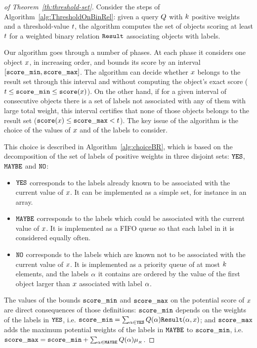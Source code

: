   \begin{PROOF}
    \begin{proof}[of Theorem~\ref{th:threshold-set}]
      Consider the steps of Algorithm~\ref{alg:ThresholdOnBinRel}:
      given a query $Q$ with $k$ positive weights and a
      threshold-value $t$, the algorithm computes the set of
      objects scoring at least $t$ for a weighted binary
      relation $\hbox{\tt Result}$ associating objects with labels.

      Our algorithm goes through a number of phases. At each phase it
      considers one object $x$, in increasing order, and bounds
      its score by an interval $[\mathtt{score\_min},\mathtt{score\_max}]$.
      The algorithm can decide whether $x$ belongs to the
      result set through this interval and without computing the
      object's exact score
      ($t\leq\mathtt{score\_min}\leq\mathtt{score}(x)$).
      On the other hand, if for a given interval of consecutive
      objects there is a set of labels not associated with any of them
      with large total weight, this interval certifies that none of
      those objects belongs to the result set
      ($\mathtt{score}(x)\leq\mathtt{score\_max}<t$).
      The key issue of the algorithm is the choice of the values of
      $x$ and of the labels to consider.

      This choice is described in Algorithm~\ref{alg:choiceBR}, which
      is based on the decomposition of the set of labels of positive
      weights in three disjoint sets: $\mathtt{YES}$, $\mathtt{MAYBE}$ and
      $\mathtt{NO}$:
      \begin{itemize}
      \item $\mathtt{YES}$ corresponds to the labels already known to be
        associated with the current value of $x$. It can be
        implemented as a simple set, for instance in an array.
      \item $\mathtt{MAYBE}$ corresponds to the labels which could be
        associated with the current value of $x$. It is
        implemented as a FIFO queue so that each label in it is
        considered equally often.
      \item $\mathtt{NO}$ corresponds to the labels which are known not to
        be associated with the current value of $x$. It is
        implemented as a priority queue of at most $k$
        elements, and the labels $\alpha$ it contains are ordered by
        the value of the first object larger than $x$
        associated with label $\alpha$.
      \end{itemize}
      The values of the bounds $\mathtt{score\_min}$ and $\mathtt{score\_max}$ on the
      potential score of $x$ are direct consequences of those
      definitions: $\mathtt{score\_min}$ depends on the weights of the labels in
      $\mathtt{YES}$, i.e.
      $\mathtt{score\_min}=\sum_{\alpha\in\mathtt{YES}}Q(\alpha)\hbox{\tt Result}(\alpha,x)$;
      and $\mathtt{score\_max}$ adds the maximum potential weights of the labels
      in $\mathtt{MAYBE}$ to $\mathtt{score\_min}$, i.e.
      $\mathtt{score\_max}=\mathtt{score\_min}+\sum_{\alpha\in\mathtt{MAYBE}}Q(\alpha)\mu_{_{R}}$.


\end{proof}
\end{PROOF}
